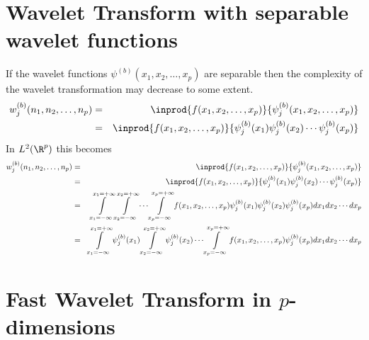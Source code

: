 \section {Wavelet Transform with separable wavelet functions}
If the wavelet functions $\psi^{(b)}(x_1, x_2, \ldots, x_p)$ are separable
then the complexity of the wavelet transformation may decrease to some 
extent.
   \begin{eqnarray*}
      w_j^{(b)}(n_1, n_2, \ldots, n_p) 
         &=& \inprod{f(x_1, x_2, \ldots, x_p)}{\psi_j^{(b)}(x_1, x_2, \ldots, x_p)}\\
         &=& \inprod{f(x_1, x_2, \ldots, x_p)}{
             \psi_j^{(b)}(x_1) \psi_j^{(b)}(x_2) \cdots \psi_j^{(b)}(x_p) }
   \end{eqnarray*}
In $L^2(\R^p)$ this becomes
   \begin{eqnarray*}
      w_j^{(b)}(n_1, n_2, \ldots, n_p) 
         &=& \inprod{f(x_1, x_2, \ldots, x_p)}{\psi_j^{(b)}(x_1, x_2, \ldots, x_p)}\\
         &=& \inprod{f(x_1, x_2, \ldots, x_p)}{
             \psi_j^{(b)}(x_1) \psi_j^{(b)}(x_2) \cdots \psi_j^{(b)}(x_p) } \\
         &=& \int\limits_{x_1=-\infty}^{x_1=+\infty}
             \int\limits_{x_2=-\infty}^{x_2=+\infty}
             \cdots
             \int\limits_{x_p=-\infty}^{x_p=+\infty}
             f(x_1, x_2, \ldots, x_p)
             \psi_j^{(b)}(x_1) \psi_j^{(b)}(x_2) \psi_j^{(b)}(x_p)
             dx_1 dx_2 \cdots dx_p  \\
         &=& \int\limits_{x_1=-\infty}^{x_1=+\infty}\psi_j^{(b)}(x_1)
             \int\limits_{x_2=-\infty}^{x_2=+\infty}\psi_j^{(b)}(x_2)
             \cdots
             \int\limits_{x_p=-\infty}^{x_p=+\infty}
             f(x_1, x_2, \ldots, x_p)
             \psi_j^{(b)}(x_p)
             dx_1 dx_2 \cdots dx_p
   \end{eqnarray*}
\fi

\section {Fast Wavelet Transform in $p$-dimensions}
